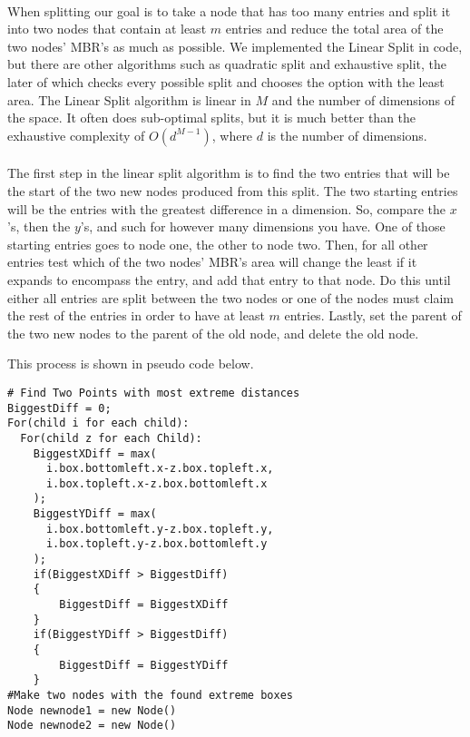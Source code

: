 \documentclass{article}
\begin{document}
\begin{multicols}{2}[]
\paragraph{}
When splitting our goal is to take a node that has too many entries and split it into
two nodes that contain at least $m$ entries and reduce the total area of the two nodes'
MBR's as much as possible. We implemented the Linear Split in code, but there are other
algorithms such as quadratic split and exhaustive split, the later of which checks every
possible split and chooses the option with the least area. The Linear Split algorithm
is linear in $M$ and the number of dimensions of the space. It often does sub-optimal
splits, but it is much better than the exhaustive complexity of $O(d^{M-1})$, where
$d$ is the number of dimensions.

\paragraph{}
The first step in the linear split algorithm is to find the two entries that will be the
start of the two new nodes produced from this split. The two starting entries will be the
entries with the greatest difference in a dimension. So, compare the $x$'s, then the $y$'s,
and such for however many dimensions you have. One of those starting entries goes to node one,
the other to node two. Then, for all other entries test which of the two nodes' MBR's area
will change the least if it expands to encompass the entry, and add that entry to that node. Do this
until either all entries are split between the two nodes or one of the nodes must claim the
rest of the entries in order to have at least $m$ entries. Lastly, set the parent of the two
new nodes to the parent of the old node, and delete the old node.

This process is shown in pseudo code below.

\begin{lstlisting}
# Find Two Points with most extreme distances
BiggestDiff = 0;
For(child i for each child):
  For(child z for each Child):
    BiggestXDiff = max(
      i.box.bottomleft.x-z.box.topleft.x,
      i.box.topleft.x-z.box.bottomleft.x
    );
    BiggestYDiff = max(
      i.box.bottomleft.y-z.box.topleft.y,
      i.box.topleft.y-z.box.bottomleft.y
    );
    if(BiggestXDiff > BiggestDiff)
    {
        BiggestDiff = BiggestXDiff
    }
    if(BiggestYDiff > BiggestDiff)
    {
        BiggestDiff = BiggestYDiff
    }
#Make two nodes with the found extreme boxes
Node newnode1 = new Node()
Node newnode2 = new Node()


\end{lstlisting}
\end{multicols}
\end{document}
